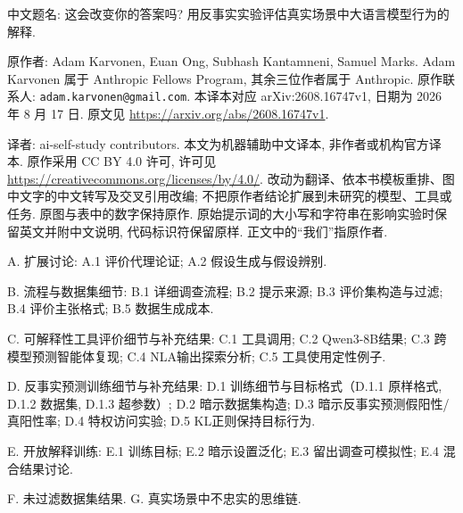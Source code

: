 \label{chive-paper}
中文题名: 这会改变你的答案吗? 用反事实实验评估真实场景中大语言模型行为的解释.

原作者: Adam Karvonen, Euan Ong, Subhash Kantamneni, Samuel Marks. Adam Karvonen 属于 Anthropic Fellows Program, 其余三位作者属于 Anthropic. 原作联系人: \texttt{adam.karvonen@gmail.com}. 本译本对应 arXiv:2608.16747v1, 日期为 2026 年 8 月 17 日. 原文见 \url{https://arxiv.org/abs/2608.16747v1}.

译者: ai-self-study contributors. 本文为机器辅助中文译本, 非作者或机构官方译本. 原作采用 CC BY 4.0 许可, 许可见 \url{https://creativecommons.org/licenses/by/4.0/}. 改动为翻译、依本书模板重排、图中文字的中文转写及交叉引用改编; 不把原作者结论扩展到未研究的模型、工具或任务. 原图与表中的数字保持原作. 原始提示词的大小写和字符串在影响实验时保留英文并附中文说明, 代码标识符保留原样. 正文中的“我们”指原作者.

\label{chive-appendix-contents}
A. 扩展讨论: A.1 评价代理论证; A.2 假设生成与假设辨别.

B. 流程与数据集细节: B.1 详细调查流程; B.2 提示来源; B.3 评价集构造与过滤; B.4 评价主张格式; B.5 数据生成成本.

C. 可解释性工具评价细节与补充结果: C.1 工具调用; C.2 Qwen3-8B结果; C.3 跨模型预测智能体复现; C.4 NLA输出探索分析; C.5 工具使用定性例子.

D. 反事实预测训练细节与补充结果: D.1 训练细节与目标格式（D.1.1 原样格式, D.1.2 数据集, D.1.3 超参数）; D.2 暗示数据集构造; D.3 暗示反事实预测假阳性/真阳性率; D.4 特权访问实验; D.5 KL正则保持目标行为.

E. 开放解释训练: E.1 训练目标; E.2 暗示设置泛化; E.3 留出调查可模拟性; E.4 混合结果讨论.

F. 未过滤数据集结果. G. 真实场景中不忠实的思维链.







\clearpage


\label{chive-end}
